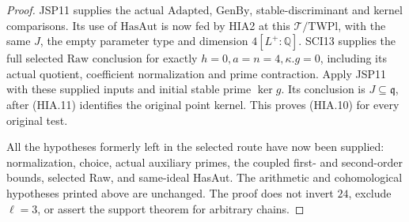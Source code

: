 \documentclass[11pt,a4paper]{article}
\numberwithin{equation}{section}
\theoremstyle{remark}\newtheorem{remark}[theorem]{Remark}
\begin{document}
\begin{proof}
JSP11 supplies the actual \(\mathrm{Adapted}\),
\(\mathrm{GenBy}\), stable-discriminant and kernel
comparisons.  Its use of \(\mathrm{HasAut}\) is now
fed by HIA2 at this \(\mathcal T/\mathrm{TWPl}\), with
the same \(J\), the empty parameter type and
dimension \(4[L^+:\mathbb Q]\).  SCI13 supplies the
full selected \(\mathrm{Raw}\) conclusion for exactly
\(h=0,a=n=4,\kappa.g=0\), including its actual
quotient, coefficient normalization and prime contraction.
Apply JSP11 with these supplied inputs and initial stable
prime \(\ker g\).  Its conclusion is
\(J\subseteq\mathfrak q\), after (HIA.11) identifies
the original point kernel.  This proves (HIA.10) for
every original test.

All the hypotheses formerly left in the selected route
have now been supplied: normalization, choice, actual
auxiliary primes, the coupled first- and second-order
bounds, selected Raw, and same-ideal HasAut.  The arithmetic
and cohomological hypotheses printed above are unchanged.
The proof does not invert \(24\), exclude \(\ell=3\),
or assert the support theorem for arbitrary chains.
\end{proof}

\end{document}
